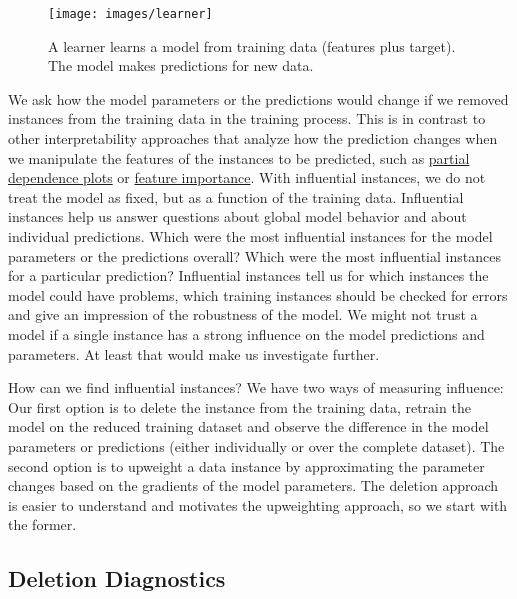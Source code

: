 \documentclass[12pt,]{krantz}
\begin{document}
\begin{figure}

{\centering \texttt{[image: images/learner]} 

}

\caption{A learner learns a model from training data (features plus target). The model makes predictions for new data.}\label{fig:learner}
\end{figure}

We ask how the model parameters or the predictions would change if we
removed instances from the training data in the training process. This
is in contrast to other interpretability approaches that analyze how the
prediction changes when we manipulate the features of the instances to
be predicted, such as \protect\hyperlink{pdp}{partial dependence plots}
or \protect\hyperlink{feature-importance}{feature importance}. With
influential instances, we do not treat the model as fixed, but as a
function of the training data. Influential instances help us answer
questions about global model behavior and about individual predictions.
Which were the most influential instances for the model parameters or
the predictions overall? Which were the most influential instances for a
particular prediction? Influential instances tell us for which instances
the model could have problems, which training instances should be
checked for errors and give an impression of the robustness of the
model. We might not trust a model if a single instance has a strong
influence on the model predictions and parameters. At least that would
make us investigate further.

How can we find influential instances? We have two ways of measuring
influence: Our first option is to delete the instance from the training
data, retrain the model on the reduced training dataset and observe the
difference in the model parameters or predictions (either individually
or over the complete dataset). The second option is to upweight a data
instance by approximating the parameter changes based on the gradients
of the model parameters. The deletion approach is easier to understand
and motivates the upweighting approach, so we start with the former.

\subsection{Deletion Diagnostics}\label{deletion-diagnostics}
\end{document}
